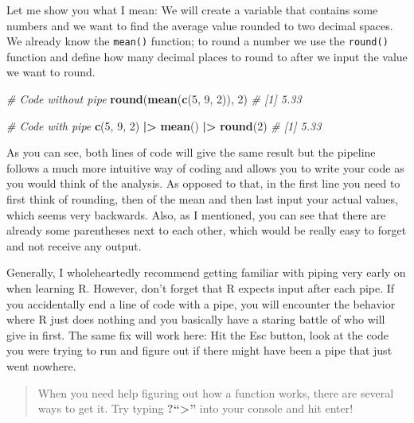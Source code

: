 \documentclass[
]{book}
\newenvironment{Shaded}{\begin{snugshade}}{\end{snugshade}}
\newcommand{\CommentTok}[1]{\textcolor[rgb]{0.56,0.35,0.01}{\textit{#1}}}
\newcommand{\DecValTok}[1]{\textcolor[rgb]{0.00,0.00,0.81}{#1}}
\newcommand{\FunctionTok}[1]{\textcolor[rgb]{0.13,0.29,0.53}{\textbf{#1}}}
\newcommand{\NormalTok}[1]{#1}
\newcommand{\SpecialCharTok}[1]{\textcolor[rgb]{0.81,0.36,0.00}{\textbf{#1}}}
\begin{document}
Let me show you what I mean: We will create a variable that contains some numbers and we want to find the average value rounded to two decimal spaces.
We already know the \texttt{mean()} function; to round a number we use the \texttt{round()} function and define how many decimal places to round to after we input the value we want to round.

\begin{Shaded}
\begin{Highlighting}[]
\CommentTok{\# Code without pipe}
\FunctionTok{round}\NormalTok{(}\FunctionTok{mean}\NormalTok{(}\FunctionTok{c}\NormalTok{(}\DecValTok{5}\NormalTok{, }\DecValTok{9}\NormalTok{, }\DecValTok{2}\NormalTok{)), }\DecValTok{2}\NormalTok{)}
\CommentTok{\# [1] 5.33}

\CommentTok{\# Code with pipe}
\FunctionTok{c}\NormalTok{(}\DecValTok{5}\NormalTok{, }\DecValTok{9}\NormalTok{, }\DecValTok{2}\NormalTok{) }\SpecialCharTok{|\textgreater{}} \FunctionTok{mean}\NormalTok{() }\SpecialCharTok{|\textgreater{}} \FunctionTok{round}\NormalTok{(}\DecValTok{2}\NormalTok{)}
\CommentTok{\# [1] 5.33}
\end{Highlighting}
\end{Shaded}

As you can see, both lines of code will give the same result but the pipeline follows a much more intuitive way of coding and allows you to write your code as you would think of the analysis.
As opposed to that, in the first line you need to first think of rounding, then of the mean and then last input your actual values, which seems very backwards.
Also, as I mentioned, you can see that there are already some parentheses next to each other, which would be really easy to forget and not receive any output.

Generally, I wholeheartedly recommend getting familiar with piping very early on when learning R.
However, don't forget that R expects input after each pipe.
If you accidentally end a line of code with a pipe, you will encounter the behavior where R just does nothing and you basically have a staring battle of who will give in first.
The same fix will work here: Hit the Esc button, look at the code you were trying to run and figure out if there might have been a pipe that just went nowhere.

\begin{quote}
When you need help figuring out how a function works, there are several ways to get it. Try typing \textbf{?``\textbar\textgreater{}'' } into your console and hit enter!
\end{quote}
\end{document}
